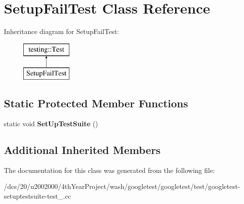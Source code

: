 \hypertarget{classSetupFailTest}{}\section{Setup\+Fail\+Test Class Reference}
\label{classSetupFailTest}
Inheritance diagram for Setup\+Fail\+Test\+:\begin{figure}[H]
\begin{center}
\leavevmode
\includegraphics[height=2.000000cm]{classSetupFailTest}
\end{center}
\end{figure}
\subsection*{Static Protected Member Functions}
\begin{DoxyCompactItemize}
\item 
\mbox{\label{classSetupFailTest_a663ad9c06dbdbf26b90cbc882cc3daf2}} 
static void {\bfseries Set\+Up\+Test\+Suite} ()
\end{DoxyCompactItemize}
\subsection*{Additional Inherited Members}


The documentation for this class was generated from the following file\+:\begin{DoxyCompactItemize}
\item 
/dcs/20/u2002000/4th\+Year\+Project/wash/googletest/googletest/test/googletest-\/setuptestsuite-\/test\+\_\+.\+cc\end{DoxyCompactItemize}
